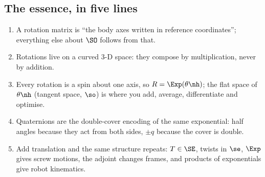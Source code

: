 \subsection{The essence, in five lines}\label{sec:rot:essence-five-lines}
\begin{enumerate}[label=\arabic*.,itemsep=1pt]
\item A rotation matrix is ``the body axes written in reference coordinates''; everything else about $\SO$ follows from that.
\item Rotations live on a curved 3-D space: they compose by multiplication, never by addition.
\item Every rotation is a spin about one axis, so $R=\Exp(\theta\nh)$; the flat space of $\theta\nh$ (tangent space, $\so$) is where you add, average, differentiate and optimise.
\item Quaternions are the double-cover encoding of the same exponential: half angles because they act from both sides, $\pm q$ because the cover is double.
\item Add translation and the same structure repeats: $T\in\SE$, twists in $\se$, $\Exp$ gives screw motions, the adjoint changes frames, and products of exponentials give robot kinematics.
\end{enumerate}
